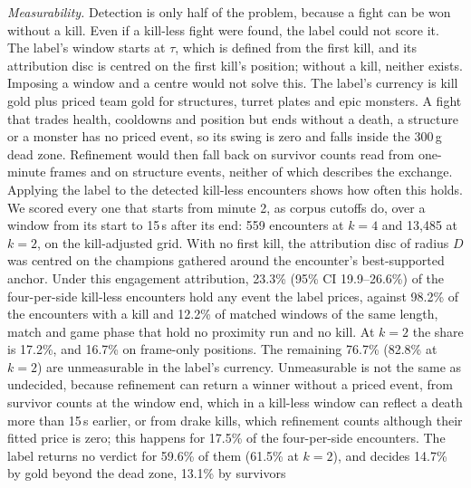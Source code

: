 \emph{Measurability.} Detection is only half of the problem, because a fight can be won without a kill.
Even if a kill-less fight were found, the label could not score it. The label's window starts at $\tau$,
which is defined from the first kill, and its attribution disc is centred on the first kill's position;
without a kill, neither exists. Imposing a window and a centre would not solve this. The label's
currency is kill gold plus priced team gold for structures, turret plates and epic monsters. A fight
that trades health, cooldowns and position but ends without a death, a structure or a monster has no
priced event, so its swing is zero and falls inside the 300\,g dead zone. Refinement would then fall back
on survivor counts read from one-minute frames and on structure events, neither of which describes the
exchange.
Applying the label to the detected kill-less encounters shows how often this holds. We scored every one that
starts from minute 2, as corpus cutoffs do, over a window from its start to 15\,s after its end: 559
encounters at $k = 4$ and 13,485 at $k = 2$, on the kill-adjusted grid. With no first kill, the
attribution disc of radius $D$ was centred on the champions gathered around the encounter's best-supported
anchor. Under this engagement attribution, 23.3\% (95\% CI 19.9--26.6\%) of the four-per-side kill-less
encounters hold any event the label prices, against 98.2\% of the encounters with a kill and 12.2\% of
matched windows of the same length, match and game phase that hold no proximity run and no kill. At $k = 2$
the share is 17.2\%, and 16.7\% on frame-only positions. The remaining 76.7\% (82.8\% at $k = 2$) are
unmeasurable in the label's currency. Unmeasurable is not the same as undecided, because refinement can
return a winner without a priced event, from survivor counts at the window end, which in a kill-less
window can reflect a death more than 15\,s earlier, or from drake kills, which refinement counts although
their fitted price is zero; this happens for 17.5\% of the four-per-side encounters. The label returns no verdict for
59.6\% of them (61.5\% at $k = 2$), and decides 14.7\% by gold beyond the dead zone, 13.1\% by survivors
